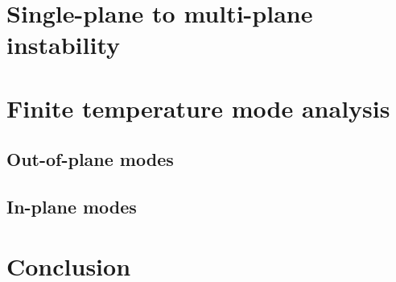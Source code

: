 \documentclass[aps, pra, preprint]{revtex4-1}
\begin{document}
\section{Single-plane to multi-plane instability}


\section{Finite temperature mode analysis}

\subsection{Out-of-plane modes}

\subsection{In-plane modes}



\section{Conclusion}


\end{document}
